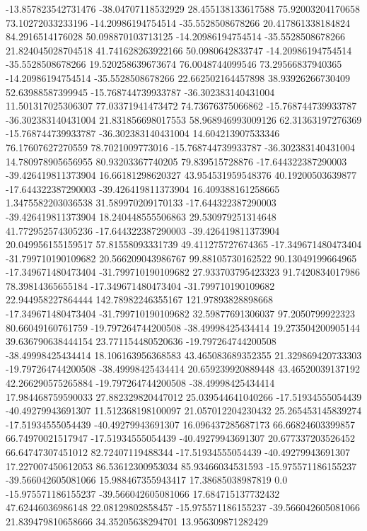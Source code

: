 -13.857823542731476 -38.04707118532929 28.455138133617588 75.92003204170658 73.10272033233196
-14.20986194754514 -35.5528508678266 20.417861338184824 84.2916514176028 50.098870103713125
-14.20986194754514 -35.5528508678266 21.824045028704518 41.741628263922166 50.0980642833747
-14.20986194754514 -35.5528508678266 19.520258639673674 76.0048744099546 73.29566837940365
-14.20986194754514 -35.5528508678266 22.662502164457898 38.93926266730409 52.63988587399945
-15.768744739933787 -36.302383140431004 11.501317025306307 77.03371941473472 74.73676375066862
-15.768744739933787 -36.302383140431004 21.831856698017553 58.968946993009126 62.31363197276369
-15.768744739933787 -36.302383140431004 14.604213907533346 76.17607627270559 78.7021009773016
-15.768744739933787 -36.302383140431004 14.780978905656955 80.93203367740205 79.839515728876
-17.644322387290003 -39.426419811373904 16.66181298620327 43.954531959548376 40.19200503639877
-17.644322387290003 -39.426419811373904 16.409388161258665 1.3475582203036538 31.589970209170133
-17.644322387290003 -39.426419811373904 18.240448555506863 29.530979251314648 41.772952574305236
-17.644322387290003 -39.426419811373904 20.049956155159517 57.81558093331739 49.411275727674365
-17.349671480473404 -31.799710190109682 20.566209043986767 99.88105730162522 90.13049199664965
-17.349671480473404 -31.799710190109682 27.933703795423323 91.7420834017986 78.39814365655184
-17.349671480473404 -31.799710190109682 22.944958227864444 142.78982246355167 121.97893828898668
-17.349671480473404 -31.799710190109682 32.59877691306037 97.2050799922323 80.66049160761759
-19.797264744200508 -38.49998425434414 19.273504200905144 39.636790638444154 23.771154480520636
-19.797264744200508 -38.49998425434414 18.106163956368583 43.465083689352355 21.329869420733303
-19.797264744200508 -38.49998425434414 20.659239920889448 43.46520039137192 42.266290575265884
-19.797264744200508 -38.49998425434414 17.984468759590033 27.882329820447012 25.039544641040266
-17.51934555054439 -40.49279943691307 11.512368198100097 21.057012204230432 25.265453145839274
-17.51934555054439 -40.49279943691307 16.096437285687173 66.66824603399857 66.74970021517947
-17.51934555054439 -40.49279943691307 20.677337203526452 66.64747307451012 82.72407119488344
-17.51934555054439 -40.49279943691307 17.227007450612053 86.53612300953034 85.93466034531593
-15.975571186155237 -39.566042605081066 15.988467355943417 17.38685038987819 0.0
-15.975571186155237 -39.566042605081066 17.684715137732432 47.62446036986148 22.08129802858457
-15.975571186155237 -39.566042605081066 21.839479810658666 34.35205638294701 13.956309871282429
